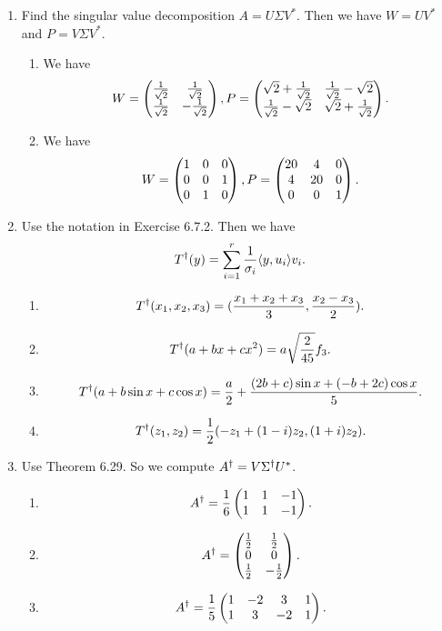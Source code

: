 \begin{enumerate}
\begin{enumerate}
\end{enumerate}
\item Find the singular value decomposition $A=U\Sigma V^*$. Then we have $W=UV^*$ and $P=V\Sigma V^*$.
\begin{enumerate}
\item We have 
\[W=\begin{pmatrix}\frac{1}{\sqrt{2}} & \frac{1}{\sqrt{2}}\cr \frac{1}{\sqrt{2}} & -\frac{1}{\sqrt{2}}\end{pmatrix},P=\begin{pmatrix}\sqrt{2}+\frac{1}{\sqrt{2}} & \frac{1}{\sqrt{2}}-\sqrt{2}\cr \frac{1}{\sqrt{2}}-\sqrt{2} & \sqrt{2}+\frac{1}{\sqrt{2}}\end{pmatrix}.\]
\item We have 
\[W=\begin{pmatrix}1 & 0 & 0\cr 0 & 0 & 1\cr 0 & 1 & 0\end{pmatrix},P=\begin{pmatrix}20 & 4 & 0\cr 4 & 20 & 0\cr 0 & 0 & 1\end{pmatrix}.\]
\end{enumerate}
\item Use the notation in Exercise 6.7.2. Then we have 
\[T^{\dagger}(y)=\sum_{i=1}^r{\frac{1}{\sigma_i}\langle y,u_i\rangle v_i}.\]
\begin{enumerate}
\item 
\[T^{\dagger}(x_1,x_2,x_3)=(\frac{x_1+x_2+x_3}{3},\frac{x_2-x_3}{2}).\]
\item 
\[T^{\dagger}(a+bx+cx^2)=a\sqrt{\frac{2}{45}}f_3.\]
\item 
\[T^{\dagger}(a+b\sin x+c\cos x)=\frac{a}{2}+\frac{(2b+c)\sin x+(-b+2c)\cos x}{5}.\]
\item 
\[T^{\dagger}(z_1,z_2)=\frac{1}{2}(-z_1+(1-i)z_2,(1+i)z_2).\]
\end{enumerate}
\item Use Theorem 6.29. So we compute $A^{\dagger}=V\Sigma ^{\dagger} U^*$.
\begin{enumerate}
\item 
\[A^{\dagger}=\frac{1}{6}\begin{pmatrix}1& 1 & -1\cr 1 & 1 & -1\end{pmatrix}.\]
\item 
\[A^{\dagger}=\begin{pmatrix}\frac{1}{2} & \frac{1}{2}\cr 0 & 0\cr \frac{1}{2} & -\frac{1}{2}\end{pmatrix}.\]
\item 
\[A^{\dagger}=\frac{1}{5}\begin{pmatrix}1&-2&3&1\\1&3&-2&1\end{pmatrix}.\]

\end{enumerate}
\end{enumerate}
